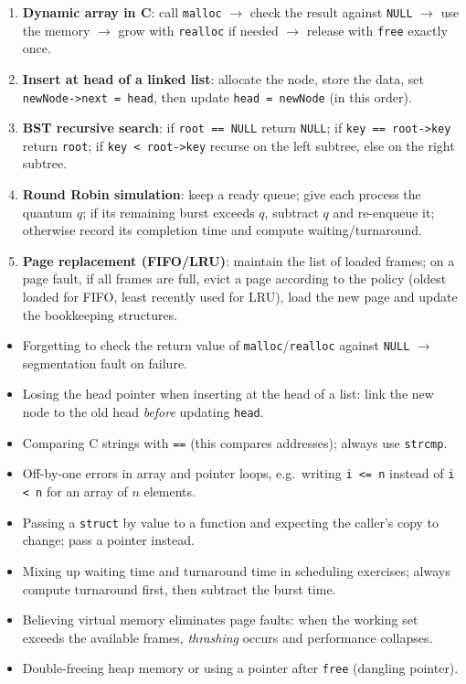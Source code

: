 \documentclass[11pt]{article}
\begin{document}
\begin{methode}
\begin{enumerate}
\item \textbf{Dynamic array in C}: call \texttt{malloc} $\rightarrow$ check the result against \texttt{NULL} $\rightarrow$ use the memory $\rightarrow$ grow with \texttt{realloc} if needed $\rightarrow$ release with \texttt{free} exactly once.
\item \textbf{Insert at head of a linked list}: allocate the node, store the data, set \texttt{newNode->next = head}, then update \texttt{head = newNode} (in this order).
\item \textbf{BST recursive search}: if \texttt{root == NULL} return \texttt{NULL}; if \texttt{key == root->key} return \texttt{root}; if \texttt{key < root->key} recurse on the left subtree, else on the right subtree.
\item \textbf{Round Robin simulation}: keep a ready queue; give each process the quantum $q$; if its remaining burst exceeds $q$, subtract $q$ and re-enqueue it; otherwise record its completion time and compute waiting/turnaround.
\item \textbf{Page replacement (FIFO/LRU)}: maintain the list of loaded frames; on a page fault, if all frames are full, evict a page according to the policy (oldest loaded for FIFO, least recently used for LRU), load the new page and update the bookkeeping structures.
\end{enumerate}
\end{methode}

\begin{attention}
\begin{itemize}
\item Forgetting to check the return value of \texttt{malloc}/\texttt{realloc} against \texttt{NULL} $\rightarrow$ segmentation fault on failure.
\item Losing the head pointer when inserting at the head of a list: link the new node to the old head \emph{before} updating \texttt{head}.
\item Comparing C strings with \texttt{==} (this compares addresses); always use \texttt{strcmp}.
\item Off-by-one errors in array and pointer loops, e.g.\ writing \texttt{i <= n} instead of \texttt{i < n} for an array of $n$ elements.
\item Passing a \texttt{struct} by value to a function and expecting the caller's copy to change; pass a pointer instead.
\item Mixing up waiting time and turnaround time in scheduling exercises; always compute turnaround first, then subtract the burst time.
\item Believing virtual memory eliminates page faults: when the working set exceeds the available frames, \emph{thrashing} occurs and performance collapses.
\item Double-freeing heap memory or using a pointer after \texttt{free} (dangling pointer).
\end{itemize}
\end{attention}
\end{document}
